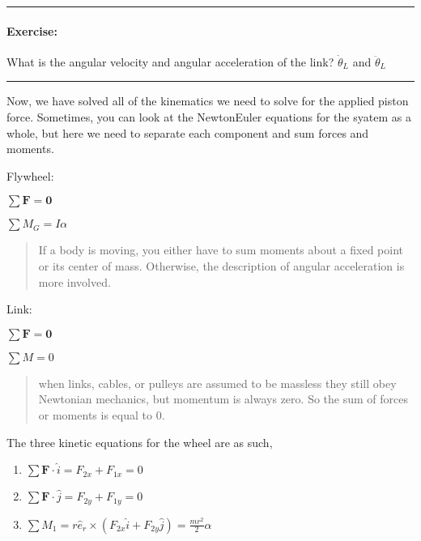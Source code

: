 \documentclass[letterpaper,10pt,english]{sphinxmanual}
\begin{document}
\noindent{}


\bigskip\hrule\bigskip



\paragraph{Exercise:}
\label{\detokenize{module_01/driving-forces:exercise}}
What is the angular velocity and angular acceleration of the link?
\(\dot{\theta}_L\) and \(\ddot{\theta}_L\)


\bigskip\hrule\bigskip


Now, we have solved all of the kinematics we need to
solve for the applied piston force. Sometimes, you can
look at the Newton\sphinxhyphen{}Euler equations for the syatem as a
whole, but here we need to separate each component and
sum forces and moments.

Flywheel:

\(\sum\mathbf{F}=\mathbf{0}\)

\(\sum M_G = I \alpha\)
\begin{quote}

 If a body is moving, you either have to sum moments about a fixed point or its center of mass. Otherwise, the description of angular acceleration is more involved.
\end{quote}

Link:

\(\sum\mathbf{F}=\mathbf{0}\)

\(\sum M = 0\)
\begin{quote}

 when links, cables, or pulleys are assumed to
be massless they still obey Newtonian mechanics, but
momentum is always zero. So the sum of forces or
moments is equal to 0.
\end{quote}

The three kinetic equations for the wheel are as such,
\begin{enumerate}
%
\item {} 
\(\sum \mathbf{F}\cdot\hat{i} = F_{2x}+F_{1x} = 0\)

\item {} 
\(\sum \mathbf{F}\cdot\hat{j} = F_{2y}+F_{1y} = 0\)

\item {} 
\(\sum M_{1} = r\hat{e}_r \times (F_{2x}\hat{i}+F_{2y}\hat{j}) = \frac{mr^2}{2}\alpha\)

\end{enumerate}
\end{document}
